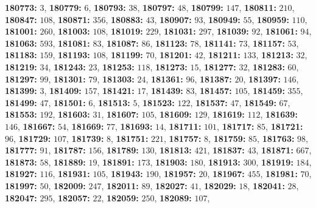 \textsf{\bfseries 180773:} $3$, \textsf{\bfseries 180779:} $6$, \textsf{\bfseries 180793:} $38$, \textsf{\bfseries 180797:} $48$, \textsf{\bfseries 180799:} $147$, \textsf{\bfseries 180811:} $210$, \textsf{\bfseries 180847:} $108$, \textsf{\bfseries 180871:} $356$, \textsf{\bfseries 180883:} $43$, \textsf{\bfseries 180907:} $93$, \textsf{\bfseries 180949:} $55$, \textsf{\bfseries 180959:} $110$, \textsf{\bfseries 181001:} $260$, \textsf{\bfseries 181003:} $108$, \textsf{\bfseries 181019:} $229$, \textsf{\bfseries 181031:} $297$, \textsf{\bfseries 181039:} $92$, \textsf{\bfseries 181061:} $94$, \textsf{\bfseries 181063:} $593$, \textsf{\bfseries 181081:} $83$, \textsf{\bfseries 181087:} $86$, \textsf{\bfseries 181123:} $78$, \textsf{\bfseries 181141:} $73$, \textsf{\bfseries 181157:} $53$, \textsf{\bfseries 181183:} $159$, \textsf{\bfseries 181193:} $108$, \textsf{\bfseries 181199:} $70$, \textsf{\bfseries 181201:} $42$, \textsf{\bfseries 181211:} $133$, \textsf{\bfseries 181213:} $32$, \textsf{\bfseries 181219:} $34$, \textsf{\bfseries 181243:} $23$, \textsf{\bfseries 181253:} $118$, \textsf{\bfseries 181273:} $15$, \textsf{\bfseries 181277:} $32$, \textsf{\bfseries 181283:} $60$, \textsf{\bfseries 181297:} $99$, \textsf{\bfseries 181301:} $79$, \textsf{\bfseries 181303:} $24$, \textsf{\bfseries 181361:} $96$, \textsf{\bfseries 181387:} $20$, \textsf{\bfseries 181397:} $146$, \textsf{\bfseries 181399:} $3$, \textsf{\bfseries 181409:} $157$, \textsf{\bfseries 181421:} $17$, \textsf{\bfseries 181439:} $83$, \textsf{\bfseries 181457:} $105$, \textsf{\bfseries 181459:} $355$, \textsf{\bfseries 181499:} $47$, \textsf{\bfseries 181501:} $6$, \textsf{\bfseries 181513:} $5$, \textsf{\bfseries 181523:} $122$, \textsf{\bfseries 181537:} $47$, \textsf{\bfseries 181549:} $67$, \textsf{\bfseries 181553:} $192$, \textsf{\bfseries 181603:} $31$, \textsf{\bfseries 181607:} $105$, \textsf{\bfseries 181609:} $129$, \textsf{\bfseries 181619:} $112$, \textsf{\bfseries 181639:} $146$, \textsf{\bfseries 181667:} $54$, \textsf{\bfseries 181669:} $77$, \textsf{\bfseries 181693:} $14$, \textsf{\bfseries 181711:} $101$, \textsf{\bfseries 181717:} $85$, \textsf{\bfseries 181721:} $96$, \textsf{\bfseries 181729:} $107$, \textsf{\bfseries 181739:} $8$, \textsf{\bfseries 181751:} $221$, \textsf{\bfseries 181757:} $8$, \textsf{\bfseries 181759:} $85$, \textsf{\bfseries 181763:} $98$, \textsf{\bfseries 181777:} $91$, \textsf{\bfseries 181787:} $156$, \textsf{\bfseries 181789:} $130$, \textsf{\bfseries 181813:} $421$, \textsf{\bfseries 181837:} $43$, \textsf{\bfseries 181871:} $667$, \textsf{\bfseries 181873:} $58$, \textsf{\bfseries 181889:} $19$, \textsf{\bfseries 181891:} $173$, \textsf{\bfseries 181903:} $180$, \textsf{\bfseries 181913:} $300$, \textsf{\bfseries 181919:} $184$, \textsf{\bfseries 181927:} $116$, \textsf{\bfseries 181931:} $105$, \textsf{\bfseries 181943:} $190$, \textsf{\bfseries 181957:} $20$, \textsf{\bfseries 181967:} $455$, \textsf{\bfseries 181981:} $70$, \textsf{\bfseries 181997:} $50$, \textsf{\bfseries 182009:} $247$, \textsf{\bfseries 182011:} $89$, \textsf{\bfseries 182027:} $41$, \textsf{\bfseries 182029:} $18$, \textsf{\bfseries 182041:} $28$, \textsf{\bfseries 182047:} $295$, \textsf{\bfseries 182057:} $22$, \textsf{\bfseries 182059:} $250$, \textsf{\bfseries 182089:} $107$, 

